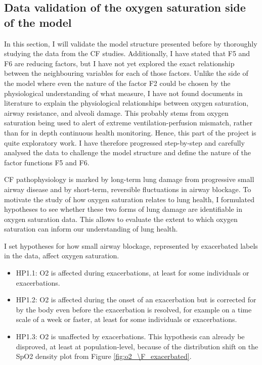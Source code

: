 
\subsection{Data validation of the oxygen saturation side of the model}

In this section, I will validate the model structure presented before by thoroughly studying the data from the CF studies. Additionally, I have stated that F5 and F6 are reducing factors, but I have not yet explored the exact relationship between the neighbouring variables for each of those factors. Unlike the \F side of the model where even the nature of the factor F2 could be chosen by the physiological understanding of what \F measure, I have not found documents in literature to explain the physiological relationships between oxygen saturation, airway resistance, and alveoli damage. This probably stems from oxygen saturation being used to alert of extreme ventilation-perfusion mismatch, rather than for in depth continuous health monitoring. Hence, this part of the project is quite exploratory work. I have therefore progressed step-by-step and carefully analysed the data to challenge the model structure and define the nature of the factor functions F5 and F6.

CF pathophysiology is marked by long-term lung damage from progressive small airway disease and by short-term, reversible fluctuations in airway blockage. To motivate the study of how oxygen saturation relates to lung health, I formulated hypotheses to see whether these two forms of lung damage are identifiable in oxygen saturation data. This allows to evaluate the extent to which oxygen saturation can inform our understanding of lung health.

I set hypotheses for how small airway blockage, represented by exacerbated labels in the data, affect oxygen saturation.
\begin{itemize}
    \item HP1.1: O2 is affected during exacerbations, at least for some individuals or exacerbations.
\item HP1.2: O2 is affected during the onset of an exacerbation but is corrected for by the body even before the exacerbation is resolved, for example on a time scale of a week or faster, at least for some individuals or exacerbations.
\item HP1.3: O2 is unaffected by exacerbations. This hypothesis can already be disproved, at least at population-level, because of the distribution shift on the SpO2 density plot from Figure \ref{fig:o2_\F_exacerbated}.
\end{itemize}

